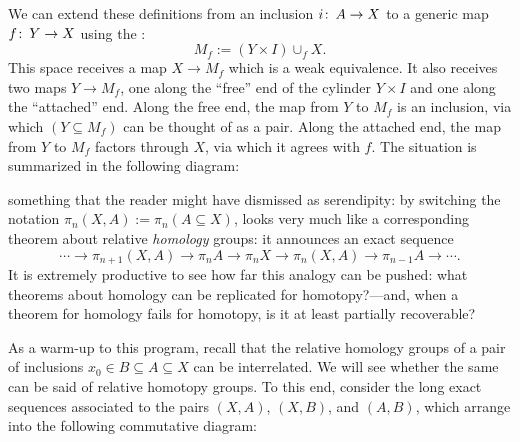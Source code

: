 \begin{remark}
We can extend these definitions from an inclusion $i\colon\thinspace A \to X$ to a generic map $f\colon\thinspace Y \to X$ using the : \[M_f := (Y \times I) \cup_f X.\]
This space receives a map $X \to M_f$ which is a weak equivalence.
It also receives two maps $Y \to M_f$, one along the ``free'' end of the cylinder $Y \times I$ and one along the ``attached'' end.
Along the free end, the map from $Y$ to $M_f$ is an inclusion, via which $(Y \subseteq M_f)$ can be thought of as a pair.
Along the attached end, the map from $Y$ to $M_f$ factors through $X$, via which it agrees with $f$.
The situation is summarized in the following diagram:
\begin{center}
\end{center}
\end{remark}


 something that the reader might have dismissed as serendipity: by switching the notation $\pi_n(X, A) := \pi_n (A \subseteq X)$,  looks very much like a corresponding theorem about relative \emph{homology} groups: it announces an exact sequence \[\cdots \to \pi_{n+1}(X, A) \to \pi_n A \to \pi_n X \to \pi_n (X, A) \to \pi_{n-1} A \to \cdots.\]
It is extremely productive to see how far this analogy can be pushed: what theorems about homology can be replicated for homotopy?---and, when a theorem for homology fails for homotopy, is it at least partially recoverable?

As a warm-up to this program, recall that the relative homology groups of a pair of inclusions $x_0 \in B \subseteq A \subseteq X$ can be interrelated.
We will see whether the same can be said of relative homotopy groups.
To this end, consider the long exact sequences associated to the pairs $(X, A)$, $(X, B)$, and $(A, B)$, which arrange into the following commutative diagram:

